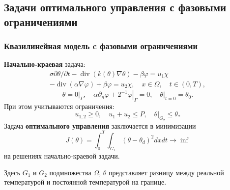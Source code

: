 \subsection{Задачи оптимального управления с фазовыми ограничениями}\label{subsec:opt-phase}
\begin{frame}
    \frametitle{Квазилинейная модель c фазовыми ограничениями}
    \textbf{Начально-краевая} задача:
    \begin{equation}
        \label{eq:3_2:1}
        \begin{gathered}
            \sigma \partial \theta / \partial t-\operatorname{div}(k(\theta)
            \nabla \theta)-\beta \varphi=u_{1} \chi \\
            -\operatorname{div}(\alpha \nabla \varphi)+\beta \varphi=u_{2}
            \chi, \quad x \in \Omega, \quad t \in(0, T),
        \end{gathered}
    \end{equation}
    \begin{equation}
        \label{eq:3_2:2}
        \theta=\left.0\right|_{\Gamma},
        \quad \alpha \partial_{n} \varphi
        +\left.2^{-1} \varphi\right|_{\Gamma}=0,
        \left.\quad \theta\right|_{t=0}=\theta_{0}.
    \end{equation}
    При этом учитываются ограничения:
    \[ u_{1,2} \geq 0, \quad u_{1}+u_{2} \leq P, \left.\quad \theta\right|_{G_{2}} \leq \theta_{*} \]
    Задача \textbf{оптимального управления} заключается в минимизации
    \[ J(\theta)=\int_{0}^{T} \int_{G_{1}}\left(\theta-\theta_{d}\right)^{2} dx dt \rightarrow \inf \]
    на решениях начально-краевой задачи.

    Здесь $G_{1}$ и $G_{2}$ подмножества $\Omega$, $\theta$
    представляет разницу между реальной температурой
    и постоянной температурой на границе.
\end{frame}

